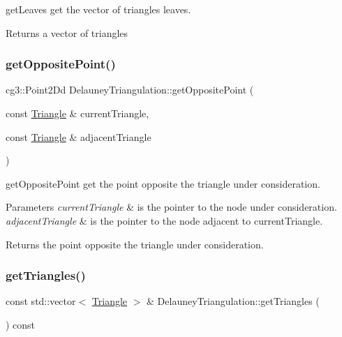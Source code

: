 get\+Leaves get the vector of triangles leaves. 

\begin{DoxyReturn}{Returns}
a vector of triangles 
\end{DoxyReturn}
\mbox{\label{classDelauneyTriangulation_a546df770889fa51378bd6e65e1825b3c}} 
\subsubsection{\texorpdfstring{get\+Opposite\+Point()}{getOppositePoint()}}
{\footnotesize\ttfamily cg3\+::\+Point2\+Dd Delauney\+Triangulation\+::get\+Opposite\+Point (\begin{DoxyParamCaption}\item[{const \hyperlink{classTriangle}{Triangle} \&}]{current\+Triangle,  }\item[{const \hyperlink{classTriangle}{Triangle} \&}]{adjacent\+Triangle }\end{DoxyParamCaption})}



get\+Opposite\+Point get the point opposite the triangle under consideration. 


\begin{DoxyParams}{Parameters}
{\em current\+Triangle} & is the pointer to the node under consideration. \\
\hline
{\em adjacent\+Triangle} & is the pointer to the node adjacent to current\+Triangle. \\
\hline
\end{DoxyParams}
\begin{DoxyReturn}{Returns}
the point opposite the triangle under consideration. 
\end{DoxyReturn}
\mbox{\label{classDelauneyTriangulation_af24d65605edf45cf31ad26243ba32bdf}} 
\subsubsection{\texorpdfstring{get\+Triangles()}{getTriangles()}}
{\footnotesize\ttfamily const std\+::vector$<$ \hyperlink{classTriangle}{Triangle} $>$ \& Delauney\+Triangulation\+::get\+Triangles (\begin{DoxyParamCaption}{ }\end{DoxyParamCaption}) const\hspace{0.3cm}{\ttfamily [inline]}}



